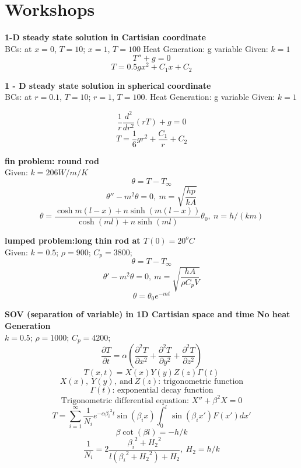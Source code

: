 \appendix
\chapter{Workshops}

\begin{example}
\textbf{1-D steady state solution in Cartisian coordinate}\\
BCs: at $x=0$, $T=10$; 
$x=1$, $T=100$ Heat Generation: g variable Given: $k=1$
$$T''+g=0$$
$$T=0.5gx^2+C_1x+C_2$$
\end{example}


\begin{example}
\textbf{1 - D steady state solution in spherical coordinate}\\
BCs: at $r = 0.1$, $T = 10$; $r = 1$, $T = 100$.
Heat Generation: g variable
Given: $k=1$

$$\frac{1}{r}\frac{d^2}{dr^2}(rT)+g=0$$
$$T=\frac{1}{6}gr^2+\frac{C_1}{r}+C_2$$
\end{example}

\begin{example}
\textbf{fin problem: round rod}\\
Given: $k=206W/m/K$
$$\theta=T-T_\infty$$
$$\theta''-m^2\theta=0,~m=\sqrt{\frac{hp}{kA}}$$
$$\theta=\frac{\cosh{m(l-x)}+n\sinh{(m(l-x))}}{\cosh{(ml)}+n\sinh{(ml)}}\theta_0,~n=h/(km)$$
\end{example}

\begin{example}
\textbf{lumped problem:long thin rod at $T(0)=20^oC$}\\
Given: $k = 0.5$; $\rho= 900$; $C_p = 3800$;
$$\theta=T-T_\infty$$
$$\theta'-m^2\theta=0,~m=\sqrt{\frac{hA}{\rho C_pV}}$$
$$\theta=\theta_0e^{-mt}$$
\end{example}

\begin{example}
\textbf{ SOV (separation of variable) in 1D Cartisian space and time
No heat Generation}\\
$k = 0.5$; $\rho=1000$; $C_p = 4200$;
$$\frac{\partial T}{\partial t}=
\alpha\left(\frac{\partial^2 T}{\partial x^2}+
\frac{\partial^2 T}{\partial y^2}+
\frac{\partial^2 T}{\partial z^2}\right)$$
$$T(x,t)=X(x)Y(y)Z(z)\Gamma(t)$$
$$X(x),~Y(y),~\text{and} ~Z(z)\text{: trigonometric function}$$
$$\Gamma(t)\text{: exponential decay function}$$
$$\text{Trigonometric differential equation: }X''+\beta^2X=0$$
$$T=\sum_{i=1}^{\infty} \frac{1}{N_i}e^{-\alpha{\beta_i}^2t}\sin{(\beta_i x)}\int_0^{l}\sin{(\beta_i x')}F(x')dx'$$
$$\beta\cot{(\beta l)}=-h/k$$
$$\frac{1}{N_i}=2\frac{{\beta_i}^2+{H_2}^2}{l({\beta_i}^2+{H_2}^2)+H_2},
~H_2=h/k$$
\end{example}

